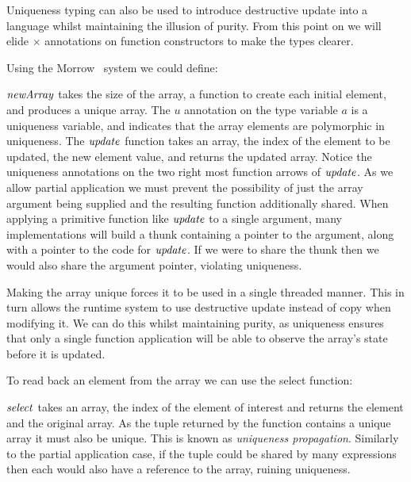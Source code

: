 Uniqueness typing can also be used to introduce destructive update into a language whilst maintaining the illusion of purity. From this point on we will elide $\times$ annotations on function constructors to make the types clearer.

Using the Morrow~\cite{vries:uniqueness-typing-simplified} system we could define:


$\operatorname{\mathit{newArray}}$ takes the size of the array, a function to create each initial element, and produces a unique array. The $u$ annotation on the type variable $a$ is a uniqueness variable, and indicates that the array elements are polymorphic in uniqueness. The $\operatorname{\mathit{update}}$ function takes an array, the index of the element to be updated, the new element value, and returns the updated array. Notice the uniqueness annotations on the two right most function arrows of $\operatorname{\mathit{update}}$. As we allow partial application we must prevent the possibility of just the array argument being supplied and the resulting function additionally shared. When applying a primitive function like $\operatorname{\mathit{update}}$ to a single argument, many implementations will build a thunk containing a pointer to the argument, along with a pointer to the code for $\operatorname{\mathit{update}}$. If we were to share the thunk then we would also share the argument pointer, violating uniqueness.

Making the array unique forces it to be used in a single threaded manner. This in turn allows the runtime system to use destructive update instead of copy when modifying it. We can do this whilst maintaining purity, as uniqueness ensures that only a single function application will be able to observe the array's state before it is updated. 

To read back an element from the array we can use the select function:


$\operatorname{\mathit{select}}$ takes an array, the index of the element of interest and returns the element and the original array. As the tuple returned by the function contains a unique array it must also be unique. This is known as \emph{uniqueness propagation}\cite{barendsen:conventional-and-uniqueness}. Similarly to the partial application case, if the tuple could be shared by many expressions then each would also have a reference to the array, ruining uniqueness. 

